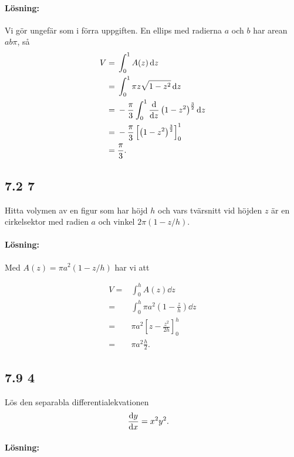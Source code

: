 \paragraph{Lösning:}

Vi gör ungefär som i förra uppgiften.
En ellips med radierna $a$ och $b$ har arean $a b \pi$, så
\begin{align*}
	V ={}& \int_0^1 A(z) \dd{z}\\
	={}& \int_0^1 \pi z \sqrt{1 - z^2} \dd{z}\\
	={}& -\frac{\pi}{3} \int_0^1 \derivative{}{z} \left(1 - z^2\right)^\frac{3}{2} \dd{z}\\
	={}& -\frac{\pi}{3} \left[ \left(1 - z^2\right)^\frac{3}{2} \right]_0^1\\
	={}& \frac{\pi}{3}.
\end{align*}


\subsection{7.2 7}%
\label{sub:7_2_7}

Hitta volymen av en figur som har höjd $h$ och vars tvärsnitt vid höjden $z$ är en cirkelsektor med radien $a$ och vinkel $2 \pi (1 - z / h)$.

\paragraph{Lösning:}

Med $A(z) = \pi a^2 (1 - z / h)$ har vi att

\begin{align*}
	V ={}& \int_0^h A(z) \dd{z}\\
	={}& \int_0^h \pi a^2 (1 - \frac{z}{h}) \dd{z}\\
	={}& \pi a^2 \left[ z - \frac{z^2}{2 h} \right]_0^h\\
	={}& \pi a^2 \frac{h}{2}.
\end{align*}


\subsection{7.9 4}%
\label{sub:7_9_4}

Lös den separabla differentialekvationen
\begin{align*}
	\derivative{y}{x} ={}& x^2 y^2.
\end{align*}

\paragraph{Lösning:}

